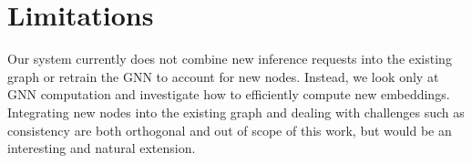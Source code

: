 
\section{Limitations}
Our system currently does not combine new inference requests into the existing graph or retrain the GNN to account for new nodes. 
Instead, we look only at GNN computation and investigate how to efficiently compute new embeddings. 
Integrating new nodes into the existing graph and dealing with challenges such as consistency are both orthogonal and out of scope of this work, but would be an interesting and natural extension.
